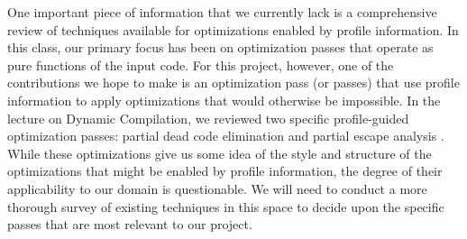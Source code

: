 \documentclass{vldb}
\begin{document}
One important piece of information that we currently lack is a comprehensive review of techniques available for optimizations enabled by profile information. In this class, our primary focus has been on optimization passes that operate as pure functions of the input code. For this project, however, one of the contributions we hope to make is an optimization pass (or passes) that use profile information to apply optimizations that would otherwise be impossible. In the lecture on Dynamic Compilation, we reviewed two specific profile-guided optimization passes: partial dead code elimination and partial escape analysis \cite{whaley01, stadler14}. While these optimizations give us some idea of the style and structure of the optimizations that might be enabled by profile information, the degree of their applicability to our domain is questionable. We will need to conduct a more thorough survey of existing techniques in this space to decide upon the specific passes that are most relevant to our project.


\newcommand{\newblock}{}

\newpage
\balance


\end{document}
